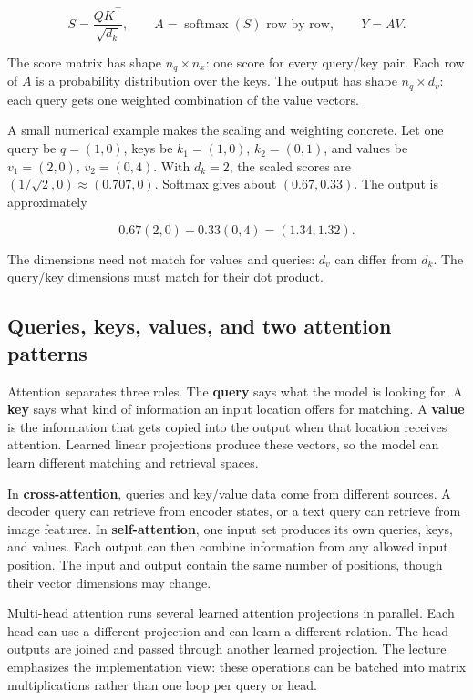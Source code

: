 \[
S=\frac{QK^\top}{\sqrt{d_k}},\qquad
A=\operatorname{softmax}(S)\text{ row by row},\qquad
Y=AV.
\]

The score matrix has shape \(n_q\times n_x\): one score for every query/key pair. Each row of \(A\) is a probability distribution over the keys. The output has shape \(n_q\times d_v\): each query gets one weighted combination of the value vectors.

A small numerical example makes the scaling and weighting concrete. Let one query be \(q=(1,0)\), keys be \(k_1=(1,0)\), \(k_2=(0,1)\), and values be \(v_1=(2,0)\), \(v_2=(0,4)\). With \(d_k=2\), the scaled scores are \((1/\sqrt2,0)\approx(0.707,0)\). Softmax gives about \((0.67,0.33)\). The output is approximately

\[
0.67(2,0)+0.33(0,4)=(1.34,1.32).
\]

The dimensions need not match for values and queries: \(d_v\) can differ from \(d_k\). The query/key dimensions must match for their dot product.

\subsection{Queries, keys, values, and two attention patterns}\label{04-visual-computing-ii-ch031-queries-keys-values-and-two-attention-patterns}

Attention separates three roles. The \textbf{query} says what the model is looking for. A \textbf{key} says what kind of information an input location offers for matching. A \textbf{value} is the information that gets copied into the output when that location receives attention. Learned linear projections produce these vectors, so the model can learn different matching and retrieval spaces.

In \textbf{cross-attention}, queries and key/value data come from different sources. A decoder query can retrieve from encoder states, or a text query can retrieve from image features. In \textbf{self-attention}, one input set produces its own queries, keys, and values. Each output can then combine information from any allowed input position. The input and output contain the same number of positions, though their vector dimensions may change.

Multi-head attention runs several learned attention projections in parallel. Each head can use a different projection and can learn a different relation. The head outputs are joined and passed through another learned projection. The lecture emphasizes the implementation view: these operations can be batched into matrix multiplications rather than one loop per query or head.

